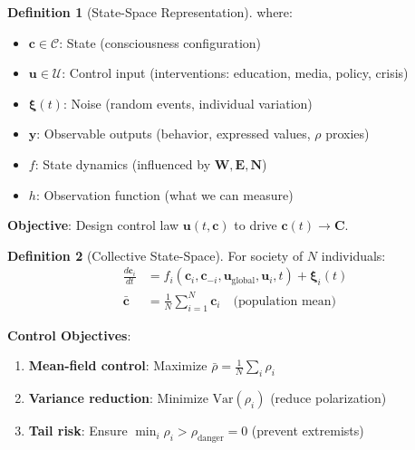 \documentclass[11pt,a4paper]{article}
\theoremstyle{definition}
\newtheorem{definition}{Definition}[section]
\theoremstyle{remark}
\newcommand{\CC}{\mathcal{C}}
\newcommand{\EE}{\mathbf{E}}
\newcommand{\WW}{\mathbf{W}}
\newcommand{\cc}{\mathbf{c}}
\begin{document}
\begin{small}
\begin{enumerate}
\begin{definition}[State-Space Representation]
where:
\begin{itemize}
    \item \(\cc \in \CC\): State (consciousness configuration)
    \item \(\mathbf{u} \in \mathcal{U}\): Control input (interventions: education, media, policy, crisis)
    \item \(\boldsymbol{\xi}(t)\): Noise (random events, individual variation)
    \item \(\mathbf{y}\): Observable outputs (behavior, expressed values, \(\rho\) proxies)
    \item \(f\): State dynamics (influenced by \(\WW, \EE, \mathbf{N}\))
    \item \(h\): Observation function (what we can measure)
\end{itemize}

\textbf{Objective}: Design control law \(\mathbf{u}(t, \cc)\) to drive \(\cc(t) \to \mathbf{C}\).
\end{definition}

\begin{definition}[Collective State-Space]
For society of \(N\) individuals:
\begin{align}
\frac{d\cc_i}{dt} &= f_i(\cc_i, \cc_{-i}, \mathbf{u}_{\text{global}}, \mathbf{u}_i, t) + \boldsymbol{\xi}_i(t) \\
\bar{\cc} &= \frac{1}{N}\sum_{i=1}^N \cc_i \quad \text{(population mean)}
\end{align}

\textbf{Control Objectives}:
\begin{enumerate}
    \item \textbf{Mean-field control}: Maximize \(\bar{\rho} = \frac{1}{N}\sum_i \rho_i\)
    \item \textbf{Variance reduction}: Minimize \(\text{Var}(\rho_i)\) (reduce polarization)
    \item \textbf{Tail risk}: Ensure \(\min_i \rho_i > \rho_{\text{danger}} = 0\) (prevent extremists)
\end{enumerate}
\end{definition}

\begin{figure}[H]
\centering
{}
\end{figure}
\end{enumerate}
\end{small}
\end{document}
